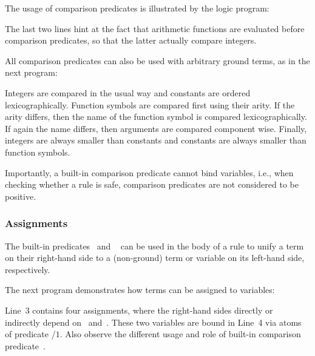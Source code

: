 \begin{example}\label{ex:arith:pred}
The usage of comparison predicates is illustrated by the logic program:%
%

%
The last two lines hint at the fact that arithmetic functions are evaluated
before comparison predicates, so that the latter actually compare integers.

All comparison predicates can also be used with arbitrary ground terms,
as in the next program:%
%

%
Integers are compared in the usual way and constants are ordered lexicographically.
Function symbols are compared first using their arity.
If the arity differs, then the name of the function symbol is compared lexicographically.
If again the name differs, then arguments are compared component wise.
Finally, integers are always smaller than constants and constants are always smaller than function symbols.
\eexample
\end{example}

Importantly, a built-in comparison predicate cannot bind variables, i.e.,
when checking whether a rule is safe, 
comparison predicates are not considered to be positive.


\subsubsection{Assignments}\label{subsec:gringo:assign}

The built-in predicates~\code{:=} and ~\code{=} can be used in the body of a rule
to unify a term on their right-hand side 
to a (non-ground) term or variable on its left-hand side, respectively.

\begin{example}\label{ex:assign}
The next program demonstrates how terms can be assigned to variables:%
%
%

%
Line~3 contains four assignments, where the right-hand sides directly or indirectly
depend on~ and~.
These two variables are bound in Line~4 via atoms of predicate /$1$.
Also observe the different usage and role of built-in comparison predicate~\code{==}.
\eexample
\end{example}

